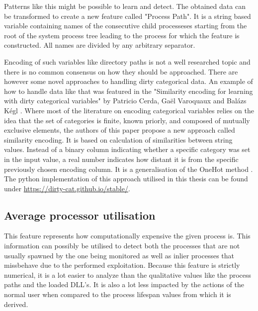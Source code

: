 \documentclass[a4paper,twoside,12pt]{book}
\begin{document}
Patterns like this might be possible to learn and detect. The obtained data can be transformed
to create a new feature called "Process Path". It is a string based variable containing names 
of the consecutive child processeses starting from the root of the system process tree leading to the 
process for which the feature is constructed. All names are divided by any arbitrary separator. 

Encoding of such variables like directory paths is not a well researched topic and there is no 
common consensus on how they should be approached. There are however some novel approaches to 
handling dirty categorical data. An example of how to handle data like that was featured in the 
"Similarity encoding for learning with dirty categorical variables" by Patricio Cerda,  Ga{\"e}l 
Varoquaux and Bal{\'a}zs K{\'e}gl \cite{bib:dirtycat}. Where most of the literature on encoding categorical variables 
relies on the idea that the set of categories is finite, known priorly, and composed of mutually 
exclusive elements, the authors of this paper propose a new approach called similarity encoding. 
It is based on calculation of similarities between string values. Instead of a binary column 
indicating whether a specific category was set in the input value, a real number indicates how 
distant it is from the specific previously chosen encoding column. It is a generalisation of the 
OneHot method \cite{bib:dirtycat}. The python implementation of this approach utilised in this thesis 
can be found under \url{https://dirty-cat.github.io/stable/}.

\subsection{Average processor utilisation}

This feature represents how computationally expensive the given process is. This information can possibly 
be utilised to detect both the processes that are not usually spawned by the one being monitored as well as
inlier processes that missbehave due to the performed exploitation. Because this feature is 
strictly numerical, it is a lot easier to analyze than the qualitative values like the process
paths and the loaded DLL's. It is also a lot less impacted by the actions of the normal user when
compared to the process lifespan values from which it is derived.

\end{document}
